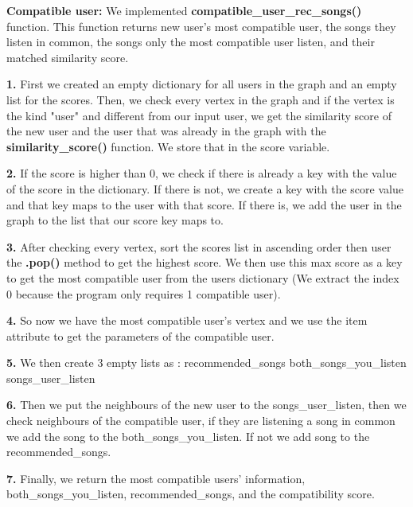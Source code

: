 \documentclass[fontsize=11pt]{article}
\numberwithin{equation}{section}
\theoremstyle{plain} %
\theoremstyle{definition}
\theoremstyle{remark}
\begin{document}
\textbf{Compatible user:}
We implemented \textbf{compatible\_user\_rec\_songs()} function. This function returns new user's most compatible user, the songs they listen in common, the songs only the most compatible user listen, and their matched similarity score.

\textbf{1.} First we created an empty dictionary for all users in the graph and an empty list for the scores. 
Then, we check every vertex in the graph and if the vertex is the kind "user" and different from our input user, we get the similarity score of the new user and the user that was already in the graph with the \textbf{similarity\_score() }function. We store that in the score variable. 

\textbf{2.} If the score is higher than 0, we check if there is already a key with the value of the score in the dictionary. If there is not, we create a key with the score value and that key maps to the user with that score. If there is, we add the user in the graph to the list that our score key maps to.    

\textbf{3.} After checking every vertex, sort the scores list in ascending order then user the \textbf{.pop()} method to get the highest score. We then use this max score as a key to get the most compatible user from the users dictionary (We extract the index 0 because the program only requires 1 compatible user).

\textbf{4.} So now we have the most compatible user's vertex and we use the item attribute to get the parameters of the compatible user.

\textbf{5.} We then create 3 empty lists as :
recommended\_songs
both\_songs\_you\_listen
songs\_user\_listen

\textbf{6.} Then we put the neighbours of the new user to the songs\_user\_listen,
then we check neighbours of the compatible user, if they are listening a song in common we add the song to the both\_songs\_you\_listen. If not we add song to the recommended\_songs.

\textbf{7.} Finally, we return the most compatible users' information, both\_songs\_you\_listen, recommended\_songs, and the compatibility score.

\bigskip
\end{document}
